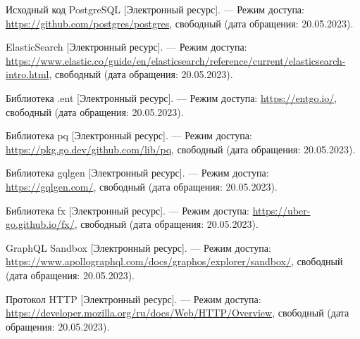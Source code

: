 \begin{thebibliography}{}
    Исходный код PostgreSQL [Электронный ресурс]. --- Режим доступа: \url{https://github.com/postgres/postgres}, свободный (дата обращения: 20.05.2023).
    
    ElasticSearch [Электронный ресурс]. --- Режим доступа: \url{https://www.elastic.co/guide/en/elasticsearch/reference/current/elasticsearch-intro.html}, свободный (дата обращения: 20.05.2023).
    
    Библиотека .ent [Электронный ресурс]. --- Режим доступа: \url{https://entgo.io/}, свободный (дата обращения: 20.05.2023).

	Библиотека pq [Электронный ресурс]. --- Режим доступа: \url{https://pkg.go.dev/github.com/lib/pq}, свободный (дата обращения: 20.05.2023).

	Библиотека gqlgen [Электронный ресурс]. --- Режим доступа: \url{https://gqlgen.com/}, свободный (дата обращения: 20.05.2023).
	
	Библиотека fx [Электронный ресурс]. --- Режим доступа: \url{https://uber-go.github.io/fx/}, свободный (дата обращения: 20.05.2023).
	
	GraphQL Sandbox [Электронный ресурс]. --- Режим доступа: \url{https://www.apollographql.com/docs/graphos/explorer/sandbox/}, свободный (дата обращения: 20.05.2023).
	
	Протокол HTTP [Электронный ресурс]. --- Режим доступа: \url{https://developer.mozilla.org/ru/docs/Web/HTTP/Overview}, свободный (дата обращения: 20.05.2023).


\end{thebibliography}
\endgroup

\pagebreak
